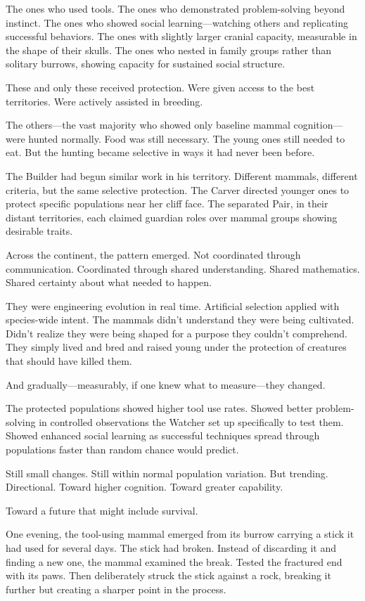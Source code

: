 The ones who used tools. The ones who demonstrated problem-solving beyond instinct. The ones who showed social learning—watching others and replicating successful behaviors. The ones with slightly larger cranial capacity, measurable in the shape of their skulls. The ones who nested in family groups rather than solitary burrows, showing capacity for sustained social structure.

These and only these received protection. Were given access to the best territories. Were actively assisted in breeding.

The others—the vast majority who showed only baseline mammal cognition—were hunted normally. Food was still necessary. The young ones still needed to eat. But the hunting became selective in ways it had never been before.

The Builder had begun similar work in his territory. Different mammals, different criteria, but the same selective protection. The Carver directed younger ones to protect specific populations near her cliff face. The separated Pair, in their distant territories, each claimed guardian roles over mammal groups showing desirable traits.

Across the continent, the pattern emerged. Not coordinated through communication. Coordinated through shared understanding. Shared mathematics. Shared certainty about what needed to happen.

They were engineering evolution in real time. Artificial selection applied with species-wide intent. The mammals didn't understand they were being cultivated. Didn't realize they were being shaped for a purpose they couldn't comprehend. They simply lived and bred and raised young under the protection of creatures that should have killed them.

And gradually—measurably, if one knew what to measure—they changed.

The protected populations showed higher tool use rates. Showed better problem-solving in controlled observations the Watcher set up specifically to test them. Showed enhanced social learning as successful techniques spread through populations faster than random chance would predict.

Still small changes. Still within normal population variation. But trending. Directional. Toward higher cognition. Toward greater capability.

Toward a future that might include survival.

\scenebreak

One evening, the tool-using mammal emerged from its burrow carrying a stick it had used for several days. The stick had broken. Instead of discarding it and finding a new one, the mammal examined the break. Tested the fractured end with its paws. Then deliberately struck the stick against a rock, breaking it further but creating a sharper point in the process.

